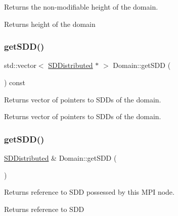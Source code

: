 Returns the non-\/modifiable height of the domain. 

\begin{DoxyReturn}{Returns}
height of the domain 
\end{DoxyReturn}
\mbox{\label{classDomain_ae560ad14f723c01663bbb783ede30fd8}} 
\subsubsection{\texorpdfstring{get\+S\+D\+D()}{getSDD()}\hspace{0.1cm}{\footnotesize\ttfamily [1/2]}}
{\footnotesize\ttfamily std\+::vector$<$ \hyperlink{classSDDistributed}{S\+D\+Distributed} $\ast$ $>$ Domain\+::get\+S\+DD (\begin{DoxyParamCaption}{ }\end{DoxyParamCaption}) const}



Returns vector of pointers to S\+D\+Ds of the domain. 

\begin{DoxyReturn}{Returns}
vector of pointers to S\+D\+Ds of the domain. 
\end{DoxyReturn}
\mbox{\label{classDomain_a26ceb37145bc70b3cc85e15e24a54287}} 
\subsubsection{\texorpdfstring{get\+S\+D\+D()}{getSDD()}\hspace{0.1cm}{\footnotesize\ttfamily [2/2]}}
{\footnotesize\ttfamily \hyperlink{classSDDistributed}{S\+D\+Distributed} \& Domain\+::get\+S\+DD (\begin{DoxyParamCaption}{ }\end{DoxyParamCaption})}



Returns reference to S\+DD possessed by this M\+PI node. 

\begin{DoxyReturn}{Returns}
reference to S\+DD 
\end{DoxyReturn}
\mbox{\label{classDomain_a5b3fd7cbe29576ea63219b326c15680e}} 
